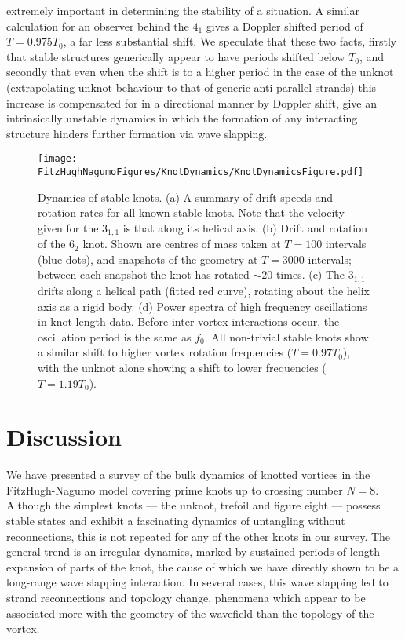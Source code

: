 extremely important in determining the stability of a situation. A similar calculation for an observer behind the $4_1$ gives a Doppler shifted period of $T=0.975T_0$, a far less substantial shift. We speculate that these two facts, firstly that stable structures generically appear to have periods shifted below $T_0$, and secondly that even when the shift is to a higher period in the case of the unknot (extrapolating unknot behaviour to that of generic anti-parallel strands) this increase is compensated for in a directional manner by Doppler shift, give an intrinsically unstable dynamics in which the formation of any interacting structure hinders further formation via wave slapping.

\begin{figure}[htbp]
    \texttt{[image: \\FitzHughNagumoFigures/KnotDynamics/KnotDynamicsFigure.pdf]}
    \caption{Dynamics of stable knots. (a) A summary of drift speeds and rotation rates for all known stable knots. Note that the velocity given for the $3_{1,1}$ is that along its helical axis. (b) Drift and rotation of the $6_2$ knot. Shown are centres of mass taken at $T=100$ intervals (blue dots), and snapshots of the geometry at $T=3000$ intervals; between each snapshot the knot has rotated $\sim 20$ times. (c) The $3_{1,1}$ drifts along a helical path (fitted red curve), rotating about the helix axis as a rigid body. (d) Power spectra of high frequency oscillations in knot length data. Before inter-vortex interactions occur, the oscillation period is the same as ${f_0}$. All non-trivial stable knots show a similar shift to higher vortex rotation frequencies ($T=0.97T_0$), with the unknot alone showing a shift to lower frequencies ($T=1.19T_0$).}
\label{fig:KnotDynamics}
\end{figure}
\section{\label{sec:Discussion}Discussion}

We have presented a survey of the bulk dynamics of knotted vortices in the FitzHugh-Nagumo model covering prime knots up to crossing number $N=8$. Although the simplest knots --- the unknot, trefoil and figure eight --- possess stable states and exhibit a fascinating dynamics of untangling without reconnections, this is not repeated for any of the other knots in our survey. The general trend is an irregular dynamics, marked by sustained periods of length expansion of parts of the knot, the cause of which we have directly shown to be a long-range wave slapping interaction. In several cases, this wave slapping led to strand reconnections and topology change, phenomena which appear to be associated more with the geometry of the wavefield than the topology of the vortex. 

